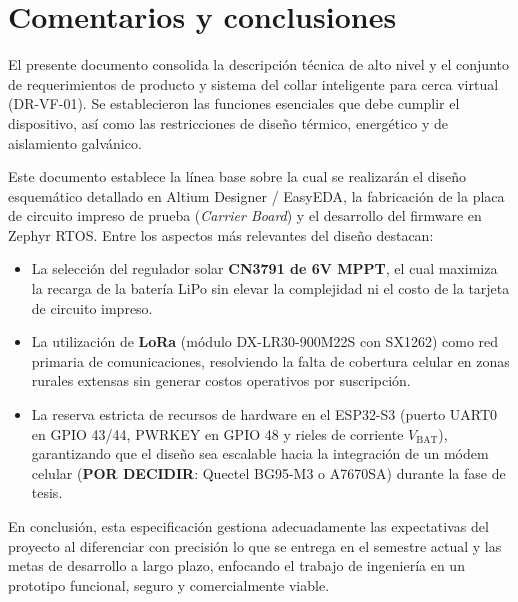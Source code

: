\section*{Comentarios y conclusiones}

El presente documento consolida la descripción técnica de alto nivel y el conjunto de requerimientos de producto y sistema del collar inteligente para cerca virtual (DR-VF-01). Se establecieron las funciones esenciales que debe cumplir el dispositivo, así como las restricciones de diseño térmico, energético y de aislamiento galvánico.

Este documento establece la línea base sobre la cual se realizarán el diseño esquemático detallado en Altium Designer / EasyEDA, la fabricación de la placa de circuito impreso de prueba (\emph{Carrier Board}) y el desarrollo del firmware en Zephyr RTOS. Entre los aspectos más relevantes del diseño destacan:
\begin{itemize}[leftmargin=*]
    \item La selección del regulador solar \textbf{CN3791 de 6V MPPT}, el cual maximiza la recarga de la batería LiPo sin elevar la complejidad ni el costo de la tarjeta de circuito impreso.
    \item La utilización de \textbf{LoRa} (módulo DX-LR30-900M22S con SX1262) como red primaria de comunicaciones, resolviendo la falta de cobertura celular en zonas rurales extensas sin generar costos operativos por suscripción.
    \item La reserva estricta de recursos de hardware en el ESP32-S3 (puerto UART0 en GPIO 43/44, PWRKEY en GPIO 48 y rieles de corriente $V_{\text{BAT}}$), garantizando que el diseño sea escalable hacia la integración de un módem celular (\textbf{POR DECIDIR}: Quectel BG95-M3 o A7670SA) durante la fase de tesis.
\end{itemize}

En conclusión, esta especificación gestiona adecuadamente las expectativas del proyecto al diferenciar con precisión lo que se entrega en el semestre actual y las metas de desarrollo a largo plazo, enfocando el trabajo de ingeniería en un prototipo funcional, seguro y comercialmente viable.